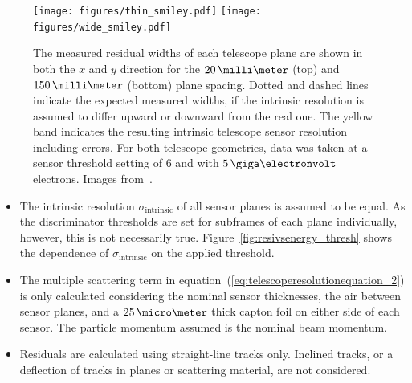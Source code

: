 \begin{figure}[tbp]
  \centering
  \texttt{[image: figures/thin\_smiley.pdf]}
  \texttt{[image: figures/wide\_smiley.pdf]}
  \caption[The measured residual widths of each telescope plane.]{The measured residual widths of each telescope plane are shown in both the $x$ and $y$ direction for the $20\,\milli\meter$ (top)
   and $150\,\milli\meter$ (bottom) plane spacing.
  Dotted and dashed lines indicate the expected measured widths, if the intrinsic resolution is assumed to differ upward or downward from the real one. 
  The yellow band indicates the resulting intrinsic telescope sensor resolution including errors.
  For both telescope geometries, data was taken at a sensor threshold setting of $6$ and with $5\,\giga\electronvolt$ electrons.
  Images from~\cite{ref:thomas}.}
  \label{fig:smiley}
\end{figure}



\begin{itemize}
\item The intrinsic resolution $\sigma_{\textrm{intrinsic}}$ of all sensor planes is assumed to be equal.
As the discriminator thresholds are set for subframes of each plane individually, however, this is not necessarily true.
Figure~\ref{fig:resivsenergy_thresh} shows the dependence of $\sigma_{\textrm{intrinsic}}$ on the applied threshold.

\item The multiple scattering term in equation~(\ref{eq:telescoperesolutionequation_2}) is only calculated considering the nominal sensor thicknesses, the air between sensor planes,
 and a $25\,\micro\meter$ thick capton foil on either side of each sensor.
The particle momentum assumed is the nominal beam momentum.

\item Residuals are calculated using straight-line tracks only.
Inclined tracks, or a deflection of tracks in planes or scattering material, are not considered.
\end{itemize}

